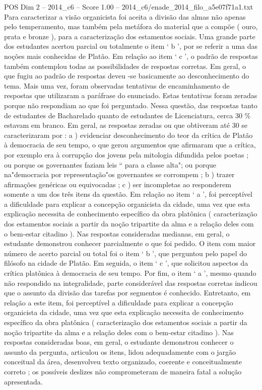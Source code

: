 \begin{textsample}{POS Dim 2 – 2014\_c6 – Score 1.00 – 2014\_c6/enade\_2014\_filo\_a5e07f71a1.txt}
Para caracterizar a visão organicista foi aceita a divisão das almas não apenas pelo temperamento, mas também pela metáfora do material que a compõe ( ouro, prata e bronze ), para a caracterização dos estamentos sociais.
Uma grande parte dos estudantes acertou parcial ou totalmente o item ‘ b ’, por se referir a uma das noções mais conhecidas de Platão.
Em relação ao item ‘ c ’, o padrão de respostas também contemplou todas as possibilidades de respostas corretas.
Em geral, o que fugiu ao padrão de respostas deveu -se basicamente ao desconhecimento do tema.
Mais uma vez, foram observadas tentativas de encaminhamento de respostas que utilizaram a paráfrase do enunciado.
Estas tentativas foram zeradas porque não respondiam ao que foi perguntado.
Nessa questão, das respostas tanto de estudantes de Bacharelado quanto de estudantes de Licenciatura, cerca 30 \% estavam em branco.
Em geral, as respostas zeradas ou que obtiveram até 30 se caracterizaram por : a ) evidenciar desconhecimento do teor da crítica de Platão à democracia de seu tempo, o que gerou argumentos que afirmaram que a crítica, por exemplo era à corrupção dos jovens pela mitologia difundida pelos poetas ; ou porque os governantes faziam leis “ para a classe alta"; ou porque na"democracia por representação"os governantes se corrompem ; b ) trazer afirmações genéricas ou equivocadas ; c ) ser incompletas ao responderem somente a um dos três itens da questão.
Em relação ao item ‘ a ’, foi perceptível a dificuldade para explicar a concepção organicista da cidade, uma vez que esta explicação necessita de conhecimento específico da obra platônica ( caracterização dos estamentos sociais a partir da noção tripartite da alma e a relação deles com o bem-estar citadino ).
Nas respostas consideradas medianas, em geral, o estudante demonstrou conhecer parcialmente o que foi pedido.
O item com maior número de acerto parcial ou total foi o item ‘ b ’, que perguntou pelo papel do filósofo na cidade de Platão.
Em seguida, o item ‘ c ’, que solicitou aspectos da crítica platônica à democracia de seu tempo.
Por fim, o item ‘ a ’, mesmo quando não respondido na integralidade, parte considerável das respostas corretas indicou que o assunto da divisão das tarefas por segmentos é conhecido.
Entretanto, em relação a este item, foi perceptível a dificuldade para explicar a concepção organicista da cidade, uma vez que esta explicação necessita de conhecimento específico da obra platônica ( caracterização dos estamentos sociais a partir da noção tripartite da alma e a relação deles com o bem-estar citadino ).
Nas respostas consideradas boas, em geral, o estudante demonstrou conhecer o assunto da pergunta, articulou os itens, lidou adequadamente com o jargão conceitual da área, desenvolveu texto organizado, coerente e conceitualmente correto ; os possíveis deslizes não comprometeram de maneira fatal a solução apresentada.

\end{textsample}
